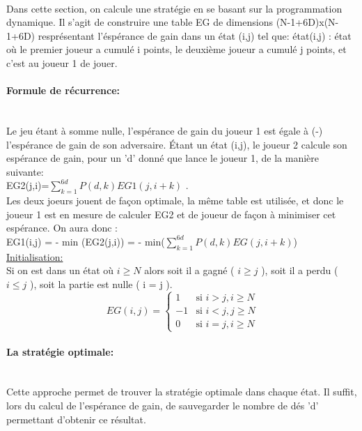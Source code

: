 \documentclass{article}
\begin{document}
    \paragraph{}
      \begin{large}
        Dans cette section, on calcule une stratégie en se basant sur la programmation dynamique. Il s'agit 
        de construire une table EG de dimensions (N-1+6D)x(N-1+6D) resprésentant l'éspérance de gain dans un état (i,j) tel que: 
        état(i,j) : état où le premier joueur a cumulé i points, le deuxième joueur a cumulé j
        points, et c'est au joueur 1 de jouer.
        \paragraph{\large{Formule de récurrence: }} \\
        Le jeu étant à somme nulle, l'espérance de gain du joueur 1 est égale à (-) l'espérance de gain de son adversaire. Étant un état (i,j),
        le joueur 2 calcule son espérance de gain, pour un 'd' donné que lance le joueur 1, de la manière suivante:\\
        EG2(j,i)=$\sum_{k=1}^{6d} {P(d,k)EG1(j,i+k)}$ .\\
        Les deux joeurs jouent de façon optimale, la même table est utilisée, et donc le joueur 1 
        est en mesure de calculer EG2 et de joueur de façon à minimiser cet espérance. On aura donc : \\
        EG1(i,j) = - min (EG2(j,i)) = - min($\sum_{k=1}^{6d} {P(d,k)EG(j,i+k)}$) \\
        \underline{Initialisation:}\\
        Si on est dans un état où $i \ge N$ alors soit il a gagné ( $i \ge j$ ), soit il a perdu ( $i \le j$ ), soit la partie est nulle ( i = j ). \\
                $$
            \ EG(i,j) = \left\{
                \begin{array}{ll}
                    1 & \mbox{si  } i>j, i\ge N \\
                    -1 & \mbox{si } i<j, j\ge N  \\
                    0 & \mbox{si  } i=j, i\ge N 
                \end{array}
            \right.
            $$
        \paragraph{La stratégie optimale: } \\
        Cette approche permet de trouver la stratégie optimale dans chaque état. Il suffit, lors du calcul 
        de l'espérance de gain, de sauvegarder le nombre de dés 'd' permettant d'obtenir ce résultat. 

\end{large}
\end{document}
